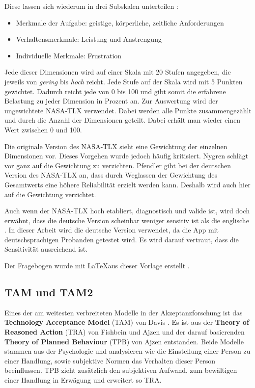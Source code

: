 Diese lassen sich wiederum in drei Subskalen unterteilen \cite{gros_bestimmung_2004}:

\begin{itemize}
	\item Merkmale der Aufgabe: geistige, körperliche, zeitliche Anforderungen
	\item Verhaltensmerkmale: Leistung und Anstrengung
	\item Individuelle Merkmale: Frustration
\end{itemize}

Jede dieser Dimensionen wird auf einer Skala mit 20 Stufen angegeben, die jeweils von \textit{gering} bis \textit{hoch} reicht. Jede Stufe auf der Skala wird mit 5 Punkten gewichtet. Dadurch reicht jede von 0 bis 100 und gibt somit die erfahrene Belastung zu jeder Dimension in Prozent an. Zur Auswertung wird der ungewichtete NASA-TLX verwendet. Dabei werden alle Punkte zusammengezählt und durch die Anzahl der Dimensionen geteilt. Dabei erhält man wieder einen Wert zwischen 0 und 100.

Die originale Version des NASA-TLX sieht eine Gewichtung der einzelnen Dimensionen vor. Dieses Vorgehen wurde jedoch häufig kritisiert. Nygren \cite{nygren_psychometric_1991} schlägt vor ganz auf die Gewichtung zu verzichten. Pfendler \cite{pfendler_vergleichende_1991} gibt bei der deutschen Version des NASA-TLX an, dass durch Weglassen der Gewichtung des Gesamtwerts eine höhere Reliabilität erzielt werden kann. Deshalb wird auch hier auf die Gewichtung verzichtet.

Auch wenn der NASA-TLX hoch etabliert, diagnostisch und valide ist, wird doch erwähnt, dass die deutsche Version scheinbar weniger sensitiv ist als die englische \cite{horold_faktor_2015}. In dieser Arbeit wird die deutsche Version verwendet, da die App mit deutschsprachigen Probanden getestet wird. Es wird darauf vertraut, dass die Sensitivität ausreichend ist. 

Der Fragebogen wurde mit \LaTeX  aus dieser Vorlage erstellt \cite{https://doi.org/10.13140/rg.2.2.26978.79044}.

\subsection{TAM und TAM2}

Eines der am weitesten verbreiteten Modelle in der Akzeptanzforschung ist das \textbf{Technology Acceptance Model} (TAM) von Davis \cite{davis_perceived_1989}. Es ist aus der \textbf{Theory of Reasoned Action} (TRA) von Fishbein und Ajzen \cite{fishbein_belief_1975} und der darauf basierenden \textbf{Theory of Planned Behaviour} (TPB) von Ajzen \cite{ajzen_theory_1991} entstanden. Beide Modelle stammen aus der Psychologie und analysieren wie die Einstellung einer Person zu einer Handlung, sowie subjektive Normen das Verhalten dieser Person beeinflussen. TPB zieht zusätzlich den subjektiven Aufwand, zum bewältigen einer Handlung in Erwägung und erweitert so TRA. 

